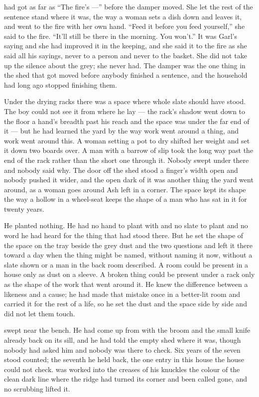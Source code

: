  had got as far as “The fire's ---” before the damper moved. She let the rest of the sentence stand where it was, the way a woman sets a dish down and leaves it, and went to the fire with her own hand. “Feed it before you feed yourself,” she said to the fire. “It'll still be there in the morning. You won't.” It was Garl's saying and she had improved it in the keeping, and she said it to the fire as she said all his sayings, never to a person and never to the basket. She did not take up the silence about the grey; she never had. The damper was the one thing in the shed that got moved before anybody finished a sentence, and the household had long ago stopped finishing them.

\scenebreak

Under the drying racks there was a space where whole slate should have stood. The boy could not see it from where he lay --- the rack's shadow went down to the floor a hand's breadth past his reach and the space was under the far end of it --- but he had learned the yard by the way work went around a thing, and work went around this. A woman setting a pot to dry shifted her weight and set it down two boards over. A man with a barrow of slip took the long way past the end of the rack rather than the short one through it. Nobody swept under there and nobody said why. The door off the shed stood a finger's width open and nobody pushed it wider, and the open dark of it was another thing the yard went around, as a woman goes around Ash left in a corner. The space kept its shape the way a hollow in a wheel-seat keeps the shape of a man who has sat in it for twenty years.

He planted nothing. He had no hand to plant with and no slate to plant and no word he had heard for the thing that had stood there. But he set the shape of the space on the tray beside the grey dust and the two questions and left it there toward a day when the thing might be named, without naming it now, without a slate shown or a man in the back room described. A room could be present in a house only as dust on a sleeve. A broken thing could be present under a rack only as the shape of the work that went around it. He knew the difference between a likeness and a cause; he had made that mistake once in a better-lit room and carried it for the rest of a life, so he set the dust and the space side by side and did not let them touch.

\scenebreak

 swept near the bench. He had come up from  with the broom and the small knife already back on its sill, and he had told the empty shed where it was, though nobody had asked him and nobody was there to check. Six years of the seven stood counted; the seventh he held back, the one entry in this house the house could not check.  was worked into the creases of his knuckles the colour of the clean dark line where the ridge had turned its corner and been called gone, and no scrubbing lifted it.

